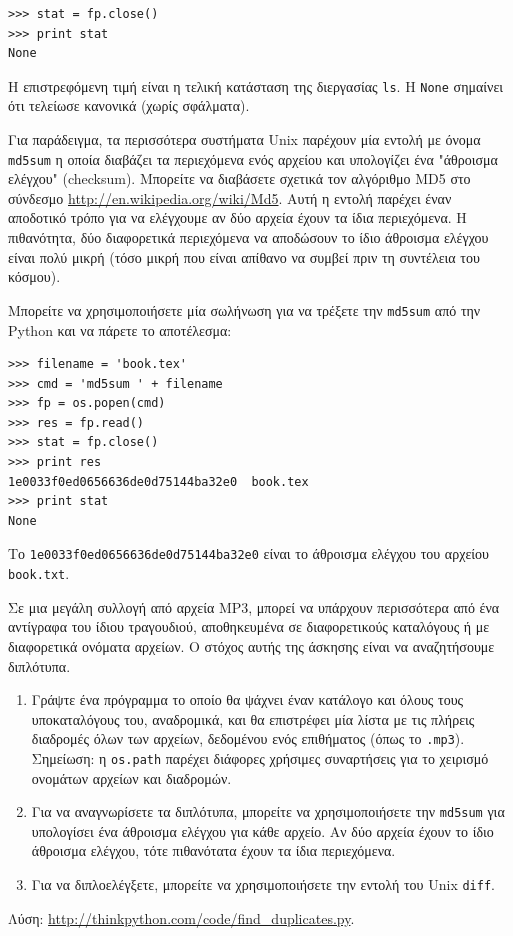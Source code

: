 \documentclass[10pt]{book}
\begin{document}
\begin{verbatim}
>>> stat = fp.close()
>>> print stat
None
\end{verbatim}
%
Η επιστρεφόμενη τιμή είναι η τελική κατάσταση της διεργασίας {\tt ls}. Η {\tt None} σημαίνει ότι τελείωσε
κανονικά (χωρίς σφάλματα).

Για παράδειγμα, τα περισσότερα συστήματα Unix παρέχουν μία εντολή με όνομα {\tt md5sum} η οποία διαβάζει τα περιεχόμενα ενός αρχείου και υπολογίζει ένα  "άθροισμα ελέγχου" (checksum). Μπορείτε να διαβάσετε σχετικά
τον αλγόριθμο MD5 στο σύνδεσμο \url{http://en.wikipedia.org/wiki/Md5}. Αυτή η εντολή παρέχει έναν αποδοτικό
τρόπο για να ελέγχουμε αν δύο αρχεία έχουν τα ίδια περιεχόμενα. Η πιθανότητα, δύο διαφορετικά περιεχόμενα να αποδώσουν το ίδιο άθροισμα ελέγχου είναι πολύ μικρή (τόσο μικρή που είναι απίθανο να συμβεί πριν τη συντέλεια του κόσμου).

Μπορείτε να χρησιμοποιήσετε μία σωλήνωση για να τρέξετε την {\tt md5sum} από την  Python  και να πάρετε
το αποτέλεσμα:

\begin{verbatim}
>>> filename = 'book.tex'
>>> cmd = 'md5sum ' + filename
>>> fp = os.popen(cmd)
>>> res = fp.read()
>>> stat = fp.close()
>>> print res
1e0033f0ed0656636de0d75144ba32e0  book.tex
>>> print stat
None
\end{verbatim}

Το {\tt 1e0033f0ed0656636de0d75144ba32e0} είναι το άθροισμα ελέγχου του αρχείου {\tt book.txt}.
\\
\begin{exercise}
\label{checksum}
Σε μια μεγάλη συλλογή από αρχεία MP3, μπορεί να υπάρχουν περισσότερα από ένα αντίγραφα του ίδιου τραγουδιού, αποθηκευμένα σε διαφορετικούς καταλόγους ή με διαφορετικά ονόματα αρχείων. Ο στόχος αυτής της άσκησης είναι να αναζητήσουμε διπλότυπα.

 
\begin{enumerate}

\item  Γράψτε ένα πρόγραμμα το οποίο θα ψάχνει έναν κατάλογο και όλους τους υποκαταλόγους του, αναδρομικά, και θα επιστρέφει μία λίστα με τις πλήρεις διαδρομές όλων των αρχείων, δεδομένου ενός επιθήματος (όπως το {\tt .mp3}). Σημείωση: η {\tt os.path} παρέχει διάφορες χρήσιμες συναρτήσεις για το χειρισμό ονομάτων αρχείων και διαδρομών.

\item  Για να αναγνωρίσετε τα διπλότυπα, μπορείτε να χρησιμοποιήσετε την {\tt md5sum} για υπολογίσει ένα άθροισμα ελέγχου για κάθε αρχείο. Αν δύο αρχεία έχουν το ίδιο άθροισμα ελέγχου, τότε πιθανότατα έχουν τα ίδια περιεχόμενα. 

\item  Για να διπλοελέγξετε, μπορείτε να χρησιμοποιήσετε την εντολή του Unix {\tt diff}.

\end{enumerate}
 
Λύση: \url{http://thinkpython.com/code/find_duplicates.py}.
\end{exercise}
\end{document}
